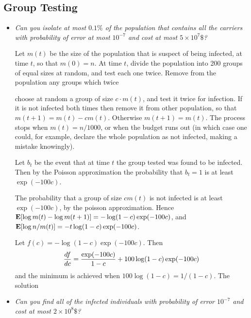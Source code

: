 \documentclass[11pt]{article} \usepackage{amssymb}
\newcommand{\E}{{\bf E}} \newcommand{\Cov}{{\bf Cov}}
\begin{document}
\subsection{Group Testing}
\begin{itemize}
\item
{\em Can you isolate at most $0.1\%$ of the population that contains all the carriers with probability of error at most $10^{-7}$ 
and cost at most $5 \times 10^{7}\$$?}

Let $m(t)$ be the size of the population that is suspect of being infected,
at time $t$, so that $m(0)=n$. At time $t$, divide the population into 200 groups
of equal sizes at random, and test each one twice. Remove from the population
any groups which twice 

choose at random a group of size
$c \cdot m(t)$, and test it twice for infection. If it is not infected both 
times then remove
it from other population, so that $m(t+1)=m(t)-cm(t)$. Otherwise $m(t+1)=m(t)$.
The process stops when $m(t)=n/1000$, or when the budget runs out (in which
case one could, for example, declare the whole population as not infected,
making a mistake knowingly).

Let $b_t$ be the event that at time $t$ the group tested was found to be 
infected. Then by the Poisson approximation the probability that $b_t=1$
is at least $\exp(-100c)$. 

The probability that a group of size $cm(t)$ is not infected is at least
$\exp(-100c)$, by the poisson approximation. Hence 
$\E[\log m(t)-\log m(t+1)] = -\log (1-c)\exp(-100c)$, and 
$\E[\log n / m(t)]=-t\log (1-c)\exp(-100c)$. 


Let $f(c)=-\log(1-c)\exp(-100c)$. Then 
$${df\over dc}={\exp(-100c)\over 1-c}+100\log(1-c)\exp(-100c)$$
and the minimum is achieved when $100\log(1-c)=1/(1-c)$. The solution 
\item
{\em Can you find all of the infected individuals with probability of error 
$10^{-7}$
and cost at most $2 \times 10^{8}\$$?}

\end{itemize}
\end{document}
